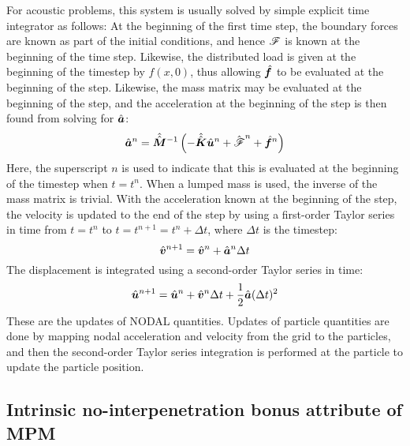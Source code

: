 For acoustic problems, this system is usually solved by simple explicit time integrator as follows: At the beginning of the first time step, the boundary forces are known as part of the initial conditions, and hence $\mathscr{F}$ is known at the beginning of the time step.  Likewise, the distributed load is given at the beginning of the timestep by $f(x,0)$, thus allowing $\hat{\bm{f}}$ to be evaluated at the beginning of the step. Likewise, the mass matrix may be evaluated at the beginning of the step, and the acceleration at the beginning of the step is then found from solving  for $\hat{\bm{a}}$:
\begin{equation}
 \hat{\bm{a}}^n= \hat{\hat{\bm{M}}}^{-1}\left(-\hat{\hat{\bm{K}}}\hat{\bm{u}}^n+\hat{\bm{\mathscr{F}}}^n  +  \hat{\bm{f}}^n\right)
\end{equation}
Here, the superscript $n$ is used to indicate that this is evaluated at the beginning of the \nth timestep when $t=t^n$.
When a lumped mass is used, the inverse of the mass matrix is trivial.
  With the acceleration known at the beginning of the step, the velocity is updated to the end of the step by using a first-order Taylor series in time from $t=t^n$ to $t=t^{n+1}=t^n+\Delta t$, where $\Delta t$ is the timestep:
\begin{equation}
  \hat{\bm{v}}^{n+1}=\hat{\bm{v}}^n+\hat{\bm{a}}^n\Delta t
\end{equation}
The displacement is integrated using a second-order Taylor series in time:
\begin{equation}
  \hat{\bm{u}}^{n+1}
=\hat{\bm{u}}^n+\hat{\bm{v}}^n \Delta t
+\frac{1}{2}\hat{\bm{a}}(\Delta t)^2
\end{equation}
These are the updates of NODAL quantities.  Updates of particle quantities are done by mapping nodal acceleration and velocity from the grid to the particles, and then the second-order Taylor series integration is performed at the particle to update the particle position.



















\subsection{Intrinsic no-interpenetration bonus attribute of MPM}





